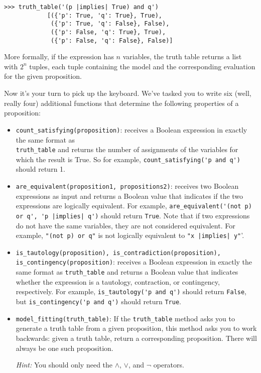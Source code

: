 \documentclass{article}
\begin{document}
\begin{itemize}
        \begin{lstlisting}[belowskip=-10pt]
            >>> truth_table('(p |implies| True) and q')
            [({'p': True, 'q': True}, True), 
             ({'p': True, 'q': False}, False), 
             ({'p': False, 'q': True}, True), 
             ({'p': False, 'q': False}, False)]
        \end{lstlisting}
        More formally, if the expression has $n$ variables, the truth table returns a list with $2^{n}$ tuples, each tuple containing the model and the corresponding evaluation for the given proposition.
    \end{itemize}
    
    Now it's your turn to pick up the keyboard. We've tasked you to write six (well, really four) additional functions that determine the following properties of a proposition:
    \begin{itemize}
        \item \lstinline+count_satisfying(proposition)+: receives a Boolean expression in exactly the same format as \\ \lstinline+truth_table+ and returns the number of assignments of the variables for which the result is True. So for example, \lstinline+count_satisfying('p and q')+ should return 1.
        \item \lstinline+are_equivalent(proposition1, propositions2)+: receives two Boolean expressions as input and returns a Boolean value that indicates if the two expressions are logically equivalent. For example, \lstinline+are_equivalent('(not p) or q', 'p |implies| q')+ should return \lstinline+True+. Note that if two expressions do not have the same variables, they are not considered equivalent. For example, \lstinline+"(not p) or q"+ is not logically equivalent to \lstinline+"x |implies| y"+'.
        \item \lstinline+is_tautology(proposition), is_contradiction(proposition), is_contingency(proposition)+: receives a Boolean expression in exactly the same format as \lstinline+truth_table+ and returns a Boolean value that indicates whether the expression is a tautology, contraction, or contingency, respectively. For example, \lstinline+is_tautology('p and q')+ should return \lstinline+False+, but \lstinline+is_contingency('p and q')+ should return \lstinline+True+.
        \item \lstinline+model_fitting(truth_table)+: If the \lstinline+truth_table+ method asks you to generate a truth table from a given proposition, this method asks you to work backwards: given a truth table, return a corresponding proposition. There will always be one such proposition.
        
        \textit{Hint:} You should only need the $\land$, $\lor$, and $\neg$ operators.
    \end{itemize}
\end{document}
